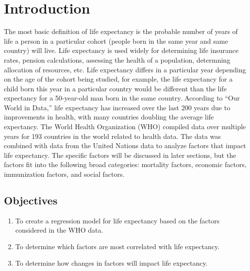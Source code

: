 \section{Introduction}
The most basic definition of life expectancy is the probable number of years of life a person in a particular cohort (people born in the same year and same country) will live. Life expectancy is used widely for determining life insurance rates, pension calculations, assessing the health of a population, determning allocation of resources, etc. Life expectancy differs in a particular year depending on the age of the cohort being studied, for example, the life expectancy for a child born this year in a particular country would be different than the life expectancy for a 50-year-old man born in the same country. According to “Our World in Data,” life expectancy has increased over the last 200 years due to improvements in health, with many countries doubling the average life expectancy. 
The World Health Organization (WHO) compiled data over multiple years for 193 countries in the world related to health data. The data was combined with data from the United Nations data to analyze factors that impact life expectancy. The specific factors will be discussed in later sections, but the factors fit into the following broad categories: mortality factors, economic factors, immunization factors, and social factors. 

\subsection{Objectives}
\label{objectives}


\begin{enumerate}
\item To create a regression model for life expectancy based on the factors considered in the WHO data.
\item To determine which factors are most correlated with life expectancy.
\item To determine how changes in factors will impact life expectancy.   
\end{enumerate}


